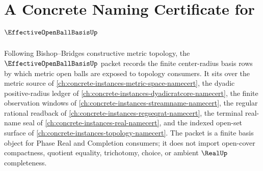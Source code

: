 \chapter{A Concrete Naming Certificate for $\EffectiveOpenBallBasisUp$}
\label{ch:concrete-instances-effective-open-ball-basis-namecert}

Following Bishop--Bridges constructive metric topology, the $\EffectiveOpenBallBasisUp$ packet records the finite center-radius basis rows by which metric open balls are exposed to topology consumers. It sits over the metric source of \autoref{ch:concrete-instances-metric-space-namecert}, the dyadic positive-radius ledger of \autoref{ch:concrete-instances-dyadicratcore-namecert}, the finite observation windows of \autoref{ch:concrete-instances-streamname-namecert}, the regular rational readback of \autoref{ch:concrete-instances-regseqrat-namecert}, the terminal real-name seal of \autoref{ch:concrete-instances-real-namecert}, and the indexed open-set surface of \autoref{ch:concrete-instances-topology-namecert}. The packet is a finite basis object for Phase Real and Completion consumers; it does not import open-cover compactness, quotient equality, trichotomy, choice, or ambient $\RealUp$ completeness.

